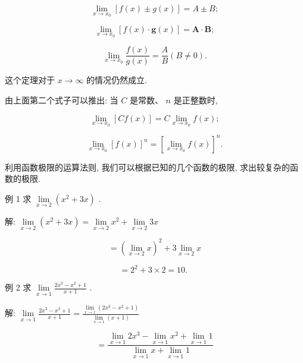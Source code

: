\documentclass[lang=cn,newtx,10pt,scheme=chinese]{elegantbook}
\begin{document}
\[
\mathop{\lim }\limits_{{x \rightarrow {x}_{0}}}\left\lbrack {f\left( x\right) \pm g\left( x\right) }\right\rbrack = A \pm B;
\]

\[
\mathop{\lim }\limits_{{x \rightarrow {x}_{0}}}\left\lbrack {f\left( x\right) \cdot \mathbf{g}\left( x\right) }\right\rbrack = \mathbf{A} \cdot \mathbf{B};
\]

\[
\mathop{\lim }\limits_{{x \rightarrow {x}_{0}}}\frac{f\left( x\right) }{g\left( x\right) } = \frac{A}{B}\left( {B \neq 0}\right) .
\]

这个定理对于 \(x \rightarrow \infty\) 的情况仍然成立.

由上面第二个式子可以推出: 当 \(C\) 是常数、 \(n\) 是正整数时,

\[
\mathop{\lim }\limits_{{x \rightarrow {x}_{0}}}\left\lbrack {{Cf}\left( x\right) }\right\rbrack = C\mathop{\lim }\limits_{{x \rightarrow {x}_{0}}}f\left( x\right) ;
\]

\[
\mathop{\lim }\limits_{{x \rightarrow {x}_{0}}}{\left\lbrack f\left( x\right) \right\rbrack }^{n} = {\left\lbrack \mathop{\lim }\limits_{{x \rightarrow {x}_{0}}}f\left( x\right) \right\rbrack }^{n}.
\]

利用函数极限的运算法则, 我们可以根据已知的几个函数的极限, 求出较复杂的函数的极限.

例 1 求 \(\mathop{\lim }\limits_{{x \rightarrow 2}}\left( {{x}^{2} + {3x}}\right)\) .

解: \(\mathop{\lim }\limits_{{x \rightarrow 2}}\left( {{x}^{2} + {3x}}\right) = \mathop{\lim }\limits_{{x \rightarrow 2}}{x}^{2} + \mathop{\lim }\limits_{{x \rightarrow 2}}{3x}\)

\[
= {\left( \mathop{\lim }\limits_{{x \rightarrow 2}}x\right) }^{2} + 3\mathop{\lim }\limits_{{x \rightarrow 2}}x
\]

\[
= {2}^{2} + 3 \times 2 = {10}\text{. }
\]

例 2 求 \(\mathop{\lim }\limits_{{x \rightarrow 1}}\frac{2{x}^{3} - {x}^{2} + 1}{x + 1}\) .

解: \(\mathop{\lim }\limits_{{x \rightarrow 1}}\frac{2{x}^{3} - {x}^{2} + 1}{x + 1} = \frac{\mathop{\lim }\limits_{{x \rightarrow 1}}\left( {2{x}^{3} - {x}^{2} + 1}\right) }{\mathop{\lim }\limits_{{x \rightarrow 1}}\left( {x + 1}\right) }\)

\[
= \frac{\mathop{\lim }\limits_{{x \rightarrow 1}}2{x}^{3} - \mathop{\lim }\limits_{{x \rightarrow 1}}{x}^{2} + \mathop{\lim }\limits_{{x \rightarrow 1}}1}{\mathop{\lim }\limits_{{x \rightarrow 1}}x + \mathop{\lim }\limits_{{x \rightarrow 1}}1}
\]
\end{document}
